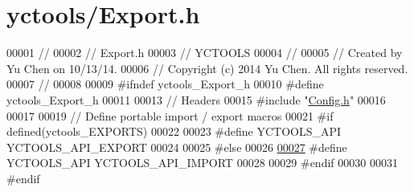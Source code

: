 \hypertarget{yctools_2_export_8h_source}{}\section{yctools/\+Export.h}
\label{yctools_2_export_8h_source}

\begin{DoxyCode}
00001 \textcolor{comment}{//}
00002 \textcolor{comment}{//  Export.h}
00003 \textcolor{comment}{//  YCTOOLS}
00004 \textcolor{comment}{//}
00005 \textcolor{comment}{//  Created by Yu Chen on 10/13/14.}
00006 \textcolor{comment}{//  Copyright (c) 2014 Yu Chen. All rights reserved.}
00007 \textcolor{comment}{//}
00008 
00009 \textcolor{preprocessor}{#ifndef yctools\_Export\_h}
00010 \textcolor{preprocessor}{#define yctools\_Export\_h}
00011 
00013 \textcolor{comment}{// Headers}
00015 \textcolor{comment}{}\textcolor{preprocessor}{#include "\hyperlink{yctools_2_config_8h}{Config.h}"}
00016 
00017 
00019 \textcolor{comment}{// Define portable import / export macros}
00021 \textcolor{comment}{}\textcolor{preprocessor}{#if defined(yctools\_EXPORTS)}
00022 
00023 \textcolor{preprocessor}{#define YCTOOLS\_API YCTOOLS\_API\_EXPORT}
00024 
00025 \textcolor{preprocessor}{#else}
00026 
\hypertarget{yctools_2_export_8h_source_l00027}{}\hyperlink{yctools_2_export_8h_aa9bd63af2d697c3f5d9ee84516c21762}{00027} \textcolor{preprocessor}{#define YCTOOLS\_API YCTOOLS\_API\_IMPORT}
00028 
00029 \textcolor{preprocessor}{#endif}
00030 
00031 \textcolor{preprocessor}{#endif}
\end{DoxyCode}

